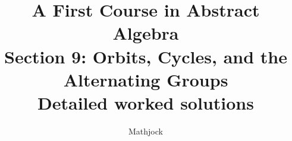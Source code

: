 
\title{\textbf{A First Course in Abstract Algebra}\\[0.3em]Section 9: Orbits, Cycles, and the Alternating Groups\\[0.3em]\large Detailed worked solutions}
\author{Mathjock}
\date{}

\maketitle
\bookinfo
\tableofcontents
\clearpage
\renewcommand{\thesection}{9}
\renewcommand{\theHsection}{fraleigh.9}


